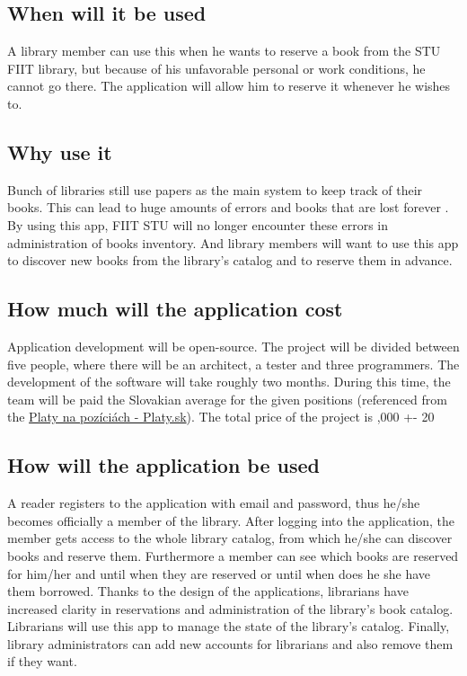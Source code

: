 \documentclass[11pt,twoside,a4paper]{article}
\begin{document}
\subsection*{When will it be used}
A library member can use this when he wants to reserve a book from the STU
FIIT library, but because of his unfavorable personal or work conditions, he
cannot go there. The application will allow him to reserve it whenever he
wishes to.

\subsection*{Why use it}
Bunch of libraries still use papers as the main system to keep track of their
books. This can lead to huge amounts of errors and books that are lost forever
. By using this app, FIIT STU will no longer encounter these errors in
administration of books inventory. And library members will want to use this
app to discover new books from the library's catalog and to reserve them in
advance.

\subsection*{How much will the application cost}
Application development will be open-source. The project will be divided
between five people, where there will be an architect, a tester and three
programmers. The development of the software will take roughly two months.
During this time, the team will be paid the Slovakian average for the given
positions (referenced from the \href{https://www.platy.sk/platy}{Platy na pozíciách - Platy.sk}). The total
price of the project is ,000 +- 20%

\subsection*{How will the application be used}
A reader registers to the application with email and password, thus he/she
becomes officially a member of the library. After logging into the application, the member gets access to the whole library catalog, from which he/she can
discover books and reserve them. Furthermore a member can see which books are
reserved for him/her and until when they are reserved or until when does he
she have them borrowed. Thanks to the design of the applications, librarians
have increased clarity in reservations and administration of the library's
book catalog. Librarians will use this app to manage the state of the library's
catalog. Finally, library administrators can add new accounts for librarians
and also remove them if they want.
\end{document}
